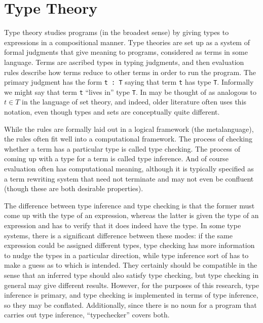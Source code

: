 \documentclass[11pt, twoside, reqno]{book}
\begin{document}

\section{Type Theory}
\label{TT}

Type theory studies programs (in the broadest sense) by giving types to expressions in a compositional manner.
Type theories are set up as a system of formal judgments that give meaning to programs, considered as terms in some language.
Terms are ascribed types in typing judgments, and then evaluation rules describe how terms reduce to other terms in order to run the program.
The primary judgment has the form \verb`t : T` saying that term \verb`t` has type \verb`T`.
Informally we might say that term \verb`t` ``lives in'' type \verb`T`.
In may be thought of as analogous to $t \in T$ in the language of set theory, and indeed, older literature often uses this notation, even though types and sets are conceptually quite different.

While the rules are formally laid out in a logical framework (the metalanguage), the rules often fit well into a computational framework.
The process of checking whether a term has a particular type is called type checking.
The process of coming up with a type for a term is called type inference.
And of course evaluation often has computational meaning, although it is typically specified as a term rewriting system that need not terminate and may not even be confluent (though these are both desirable properties).

The difference between type inference and type checking is that the former must come up with the type of an expression, whereas the latter is given the type of an expression and has to verify that it does indeed have the type.
In some type systems, there is a significant difference between these modes: if the same expression could be assigned different types, type checking has more information to nudge the types in a particular direction, while type inference sort of has to make a guess as to which is intended.
They certainly should be compatible in the sense that an inferred type should also satisfy type checking, but type checking in general may give different results.
However, for the purposes of this research, type inference is primary, and type checking is implemented in terms of type inference, so they may be conflated.
Additionally, since there is no noun for a program that carries out type inference, ``typechecker'' covers both.
\end{document}
